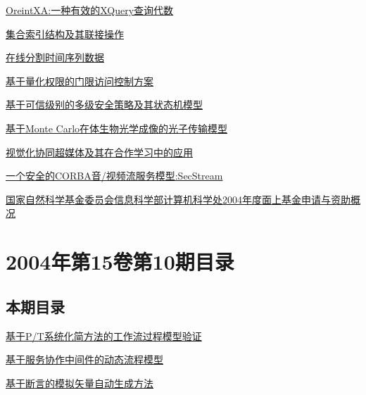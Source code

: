 \documentclass[a4paper]{article}
\begin{document}
\href{http://www.jos.org.cn/ch/reader/download_pdf.aspx?file_no=20041107&year_id=2004&quarter_id=11&falg=1}{OreintXA:一种有效的XQuery查询代数}

\href{http://www.jos.org.cn/ch/reader/download_pdf.aspx?file_no=20041108&year_id=2004&quarter_id=11&falg=1}{集合索引结构及其联接操作}

\href{http://www.jos.org.cn/ch/reader/download_pdf.aspx?file_no=20041109&year_id=2004&quarter_id=11&falg=1}{在线分割时间序列数据}

\href{http://www.jos.org.cn/ch/reader/download_pdf.aspx?file_no=20041110&year_id=2004&quarter_id=11&falg=1}{基于量化权限的门限访问控制方案}

\href{http://www.jos.org.cn/ch/reader/download_pdf.aspx?file_no=20041112&year_id=2004&quarter_id=11&falg=1}{基于可信级别的多级安全策略及其状态机模型}

\href{http://www.jos.org.cn/ch/reader/download_pdf.aspx?file_no=20041113&year_id=2004&quarter_id=11&falg=1}{基于Monte Carlo在体生物光学成像的光子传输模型}

\href{http://www.jos.org.cn/ch/reader/download_pdf.aspx?file_no=20041114&year_id=2004&quarter_id=11&falg=1}{视觉化协同超媒体及其在合作学习中的应用}

\href{http://www.jos.org.cn/ch/reader/download_pdf.aspx?file_no=20041115&year_id=2004&quarter_id=11&falg=1}{一个安全的CORBA音/视频流服务模型:SecStream}

\href{http://www.jos.org.cn/ch/reader/download_pdf.aspx?file_no=20041116&year_id=2004&quarter_id=11&falg=1}{国家自然科学基金委员会信息科学部计算机科学处2004年度面上基金申请与资助概况}


\section{\textbf{2004年第15卷第10期目录}}
\subsection{本期目录}
\href{http://www.jos.org.cn/ch/reader/download_pdf.aspx?file_no=20041001&year_id=2004&quarter_id=10&falg=1}{基于P/T系统化简方法的工作流过程模型验证}

\href{http://www.jos.org.cn/ch/reader/download_pdf.aspx?file_no=20041002&year_id=2004&quarter_id=10&falg=1}{基于服务协作中间件的动态流程模型}

\href{http://www.jos.org.cn/ch/reader/download_pdf.aspx?file_no=20041003&year_id=2004&quarter_id=10&falg=1}{基于断言的模拟矢量自动生成方法}
\end{document}
